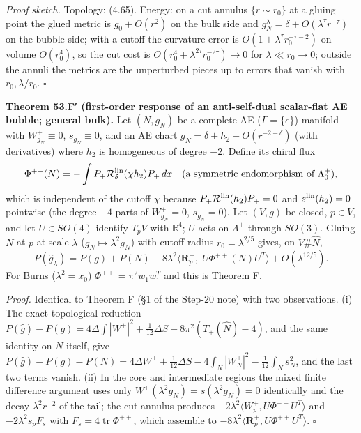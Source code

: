 \documentclass[
  10pt,
]{report}
\begin{document}
\emph{Proof sketch.} Topology: (4.65). Energy: on a cut annulus
\(\{r\sim r_0\}\) at a gluing point the glued metric is \(g_0+O(r^2)\)
on the bulk side and \(g_N^{\lambda}=\delta+O(\lambda^\tau r^{-\tau})\)
on the bubble side; with a cutoff the curvature error is
\(O(1+\lambda^\tau r_0^{-\tau-2})\) on volume \(O(r_0^4)\), so the cut
cost is \(O(r_0^4+\lambda^{2\tau}r_0^{-2\tau})\to0\) for
\(\lambda\ll r_0\to0\); outside the annuli the metrics are the
unperturbed pieces up to errors that vanish with \(r_0,\lambda/r_0\).
\(\square\)

\textbf{Theorem 53.F′ (first-order response of an anti-self-dual
scalar-flat AE bubble; general bulk).} Let \((N,g_N)\) be a complete AE
(\(\Gamma=\{e\}\)) manifold with \(W^+_{g_N}\equiv0\),
\(s_{g_N}\equiv0\), and an AE chart \(g_N=\delta+h_2+O(r^{-2-\delta})\)
(with derivatives) where \(h_2\) is homogeneous of degree \(-2\). Define
its chiral flux \[
\Phi^{++}(N)=-\int P_+\mathcal R^{\rm lin}_\delta(\chi h_2)P_+\,dx\quad(\text{a symmetric endomorphism of }\Lambda^+_0),
\] which is independent of the cutoff \(\chi\) because
\(P_+\mathcal R^{\rm lin}(h_2)P_+=0\) and \(s^{\rm lin}(h_2)=0\)
pointwise (the degree \(-4\) parts of \(W^+_{g_N}=0\), \(s_{g_N}=0\)).
Let \((V,g)\) be closed, \(p\in V\), and let \(U\in SO(4)\) identify
\(T_pV\) with \(\mathbb R^4\); \(U\) acts on \(\Lambda^+\) through
\(SO(3)\). Gluing \(N\) at \(p\) at scale \(\lambda\)
(\(g_N\mapsto\lambda^2g_N\)) with cutoff radius \(r_0=\lambda^{2/5}\)
gives, on \(V\#\widehat N\), \[
\boxed{\;P(\hat g_\lambda)=P(g)+P(N)-8\lambda^2\big\langle\mathbf R^+_p,\;U\Phi^{++}(N)U^{T}\big\rangle+O(\lambda^{12/5}).\;}
\] For Burns (\(\lambda^2=x_0\)) \(\Phi^{++}=\pi^2w_1w_1^T\) and this is
Theorem F.

\emph{Proof.} Identical to Theorem F (§1 of the Step-20 note) with two
observations. (i) The exact topological reduction
\(P(\hat g)-P(g)=4\Delta\!\int|W^+|^2+\tfrac1{12}\Delta S-8\pi^2(T_+(\widehat N)-4)\),
and the same identity on \(N\) itself, give
\(P(\hat g)-P(g)-P(N)=4\Delta W^++\tfrac1{12}\Delta S-4\int_N|W^+_N|^2-\tfrac1{12}\int_Ns_N^2\),
and the last two terms vanish. (ii) In the core and intermediate regions
the mixed finite difference argument uses only
\(W^+(\lambda^2g_N)=s(\lambda^2g_N)=0\) identically and the decay
\(\lambda^2r^{-2}\) of the tail; the cut annulus produces
\(-2\lambda^2\langle W^+_p,U\Phi^{++}U^T\rangle\) and
\(-2\lambda^2s_pF_s\) with \(F_s=4\operatorname{tr}\Phi^{++}\), which
assemble to \(-8\lambda^2\langle\mathbf R^+_p,U\Phi^{++}U^T\rangle\).
\(\square\)
\end{document}
